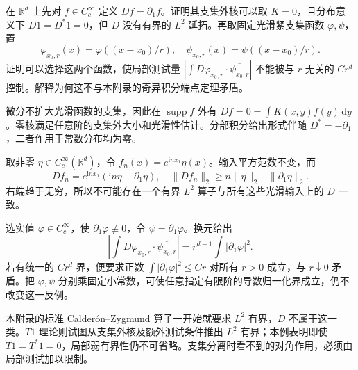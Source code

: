 \begin{exercise}\label{b2:ex:app-C-8}
在 \(\mathbb R^d\) 上先对 \(f\in C_c^\infty\) 定义 \(Df=\partial_1f\)。证明其支集外核可以取 \(K=0\)，且分布意义下 \(D1=D^*1=0\)，但 \(D\) 没有有界的 \(L^2\) 延拓。再取固定光滑紧支集函数 \(\varphi,\psi\)，置
\[
 \varphi_{x_0,r}(x)=\varphi((x-x_0)/r),\quad
 \psi_{x_0,r}(x)=\psi((x-x_0)/r).
\]
证明可以选择这两个函数，使局部测试量
\( |\int D\varphi_{x_0,r}\cdot\overline{\psi_{x_0,r}}|\)
不能被与 \(r\) 无关的 \(Cr^d\) 控制。解释为何这不与本附录的奇异积分端点定理矛盾。
\end{exercise}
\begin{solution}
微分不扩大光滑函数的支集，因此在 \(\operatorname{supp}f\) 外有 \(Df=0=\int K(x,y)f(y)\,\mathrm dy\)。零核满足任意阶的支集外大小和光滑性估计。分部积分给出形式伴随 \(D^*=-\partial_1\)，二者作用于常数分布均为零。

取非零 \(\eta\in C_c^\infty(\mathbb R^d)\)，令 \(f_n(x)=e^{\mathrm inx_1}\eta(x)\)。输入平方范数不变，而
\[
 Df_n=e^{\mathrm inx_1}(\mathrm in\eta+\partial_1\eta),\quad
 \|Df_n\|_2\geq n\|\eta\|_2-\|\partial_1\eta\|_2.
\]
右端趋于无穷，所以不可能存在一个有界 \(L^2\) 算子与所有这些光滑输入上的 \(D\) 一致。

选实值 \(\varphi\in C_c^\infty\)，使 \(\partial_1\varphi\not\equiv0\)，令 \(\psi=\partial_1\varphi\)。换元给出
\[
 \left|\int D\varphi_{x_0,r}\cdot\overline{\psi_{x_0,r}}\right|
 =r^{d-1}\int|\partial_1\varphi|^2.
\]
若有统一的 \(Cr^d\) 界，便要求正数 \(\int|\partial_1\varphi|^2\leq Cr\) 对所有 \(r>0\) 成立，与 \(r\downarrow0\) 矛盾。把 \(\varphi,\psi\) 分别乘固定小常数，可使任意指定有限阶的导数归一化界成立，仍不改变这一反例。

本附录的标准 Calderón--Zygmund 算子一开始就要求 \(L^2\) 有界，\(D\) 不属于这一类。\(T1\) 理论则试图从支集外核及额外测试条件推出 \(L^2\) 有界；本例表明即使 \(T1=T^*1=0\)，局部弱有界性仍不可省略。支集分离时看不到的对角作用，必须由局部测试加以限制。
\end{solution}
